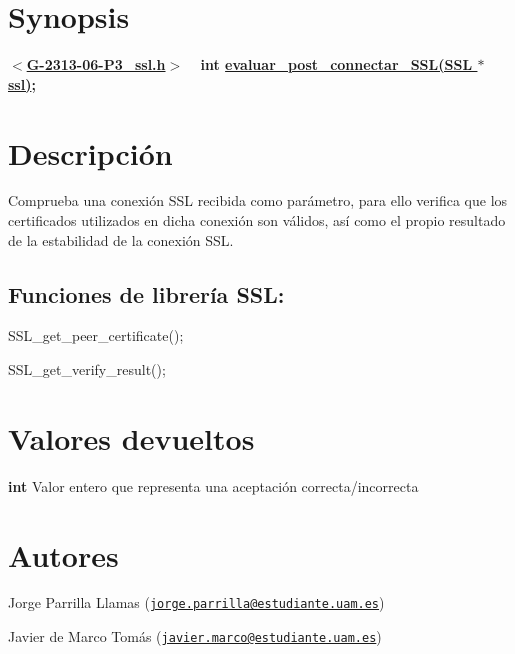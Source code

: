 \hypertarget{evaluar_post_connectar_SSL_synopsis_3}{}\section{Synopsis}\label{evaluar_post_connectar_SSL_synopsis_3}
{ {\bfseries $<$\hyperlink{G-2313-06-P3__ssl_8h}{G-\/2313-\/06-\/\+P3\+\_\+ssl.\+h}$>$} ~\newline
 {\bfseries int \hyperlink{G-2313-06-P3__ssl_8c_ac5f32cf09e3c0efd5cbc25452ed192a9}{evaluar\+\_\+post\+\_\+connectar\+\_\+\+S\+S\+L(\+S\+S\+L $\ast$ ssl)};} } \hypertarget{evaluar_post_connectar_SSL_descripcion_3}{}\section{Descripción}\label{evaluar_post_connectar_SSL_descripcion_3}
Comprueba una conexión S\+SL recibida como parámetro, para ello verifica que los certificados utilizados en dicha conexión son válidos, así como el propio resultado de la estabilidad de la conexión S\+SL. ~\newline
\subsection*{{\bfseries Funciones de librería S\+SL\+:}}


\begin{DoxyItemize}
\item S\+S\+L\+\_\+get\+\_\+peer\+\_\+certificate(); 
\item S\+S\+L\+\_\+get\+\_\+verify\+\_\+result(); 
\end{DoxyItemize}\hypertarget{evaluar_post_connectar_SSL_return_3}{}\section{Valores devueltos}\label{evaluar_post_connectar_SSL_return_3}

\begin{DoxyItemize}
\item {\bfseries int} Valor entero que representa una aceptación correcta/incorrecta 
\end{DoxyItemize}\hypertarget{evaluar_post_connectar_SSL_authors_3}{}\section{Autores}\label{evaluar_post_connectar_SSL_authors_3}

\begin{DoxyItemize}
\item Jorge Parrilla Llamas (\href{mailto:jorge.parrilla@estudiante.uam.es}{\tt jorge.\+parrilla@estudiante.\+uam.\+es}) 
\item Javier de Marco Tomás (\href{mailto:javier.marco@estudiante.uam.es}{\tt javier.\+marco@estudiante.\+uam.\+es}) 
\end{DoxyItemize}